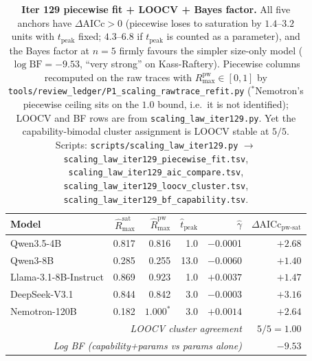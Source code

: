 \begin{table}[t]
  \centering
  \small
  \begin{tabular}{lrrrrr}
    \toprule
    Model & $\hat R_{\max}^{\text{sat}}$ &
           $\hat R_{\max}^{\text{pw}}$ &
           $\hat t_\mathrm{peak}$ & $\hat\gamma$ &
           $\Delta\text{AICc}_\text{pw-sat}$ \\
    \midrule
    Qwen3.5-4B             & 0.817 & 0.816 & 1.0 & $-$0.0001 & $+2.68$ \\
    Qwen3-8B               & 0.285 & 0.255 & 13.0 & $-$0.0060 & $+1.40$ \\
    Llama-3.1-8B-Instruct  & 0.869 & 0.923 & 1.0 & $+0.0037$ & $+1.47$ \\
    DeepSeek-V3.1          & 0.844 & 0.842 & 3.0 & $-$0.0003 & $+3.16$ \\
    Nemotron-120B          & 0.182 & $1.000^{\ast}$ & 3.0 & $+0.0014$ & $+2.64$ \\
    \midrule
    \multicolumn{5}{r}{\emph{LOOCV cluster agreement}} & $5/5 = 1.00$ \\
    \multicolumn{5}{r}{\emph{Log BF (capability+params vs params alone)}} & $-9.53$ \\
    \bottomrule
  \end{tabular}
  \caption{\textbf{Iter 129 piecewise fit + LOOCV + Bayes factor.}
    All five anchors have $\Delta\text{AICc} > 0$ (piecewise loses
    to saturation by $1.4$--$3.2$ units with $t_\mathrm{peak}$ fixed;
    $4.3$--$6.8$ if $t_\mathrm{peak}$ is counted as a parameter), and the Bayes factor at $n=5$ firmly favours the
    simpler size-only model ($\log \mathrm{BF} = -9.53$, ``very
    strong'' on Kass-Raftery).  Piecewise columns recomputed on the
    raw traces with $R_{\max}^{\text{pw}} \in [0,1]$ by \texttt{tools/review\_ledger/P1\_scaling\_rawtrace\_refit.py}
    ($^{\ast}$Nemotron's piecewise ceiling sits on the $1.0$ bound, i.e.\
    it is not identified); LOOCV and BF rows are from
    \texttt{scaling\_law\_iter129.py}.
    Yet the capability-bimodal cluster assignment is LOOCV stable
    at $5/5$.  Scripts:
    \texttt{scripts/scaling\_law\_iter129.py} $\to$
    \texttt{scaling\_law\_iter129\_piecewise\_fit.tsv},
    \texttt{scaling\_law\_iter129\_aic\_compare.tsv},
    \texttt{scaling\_law\_iter129\_loocv\_cluster.tsv},
    \texttt{scaling\_law\_iter129\_bf\_capability.tsv}.}
  \label{tab:scaling-iter129-fit}
\end{table}

